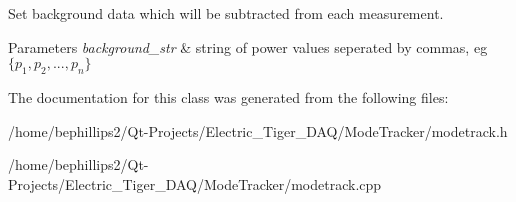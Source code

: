 Set background data which will be subtracted from each measurement. 


\begin{DoxyParams}{Parameters}
{\em background\+\_\+str} & string of power values seperated by commas, eg $ \{p_1,p_2,...,p_n\}$ \\
\hline
\end{DoxyParams}


The documentation for this class was generated from the following files\+:\begin{DoxyCompactItemize}
\item 
/home/bephillips2/\+Qt-\/\+Projects/\+Electric\+\_\+\+Tiger\+\_\+\+D\+A\+Q/\+Mode\+Tracker/modetrack.\+h\item 
/home/bephillips2/\+Qt-\/\+Projects/\+Electric\+\_\+\+Tiger\+\_\+\+D\+A\+Q/\+Mode\+Tracker/modetrack.\+cpp\end{DoxyCompactItemize}
